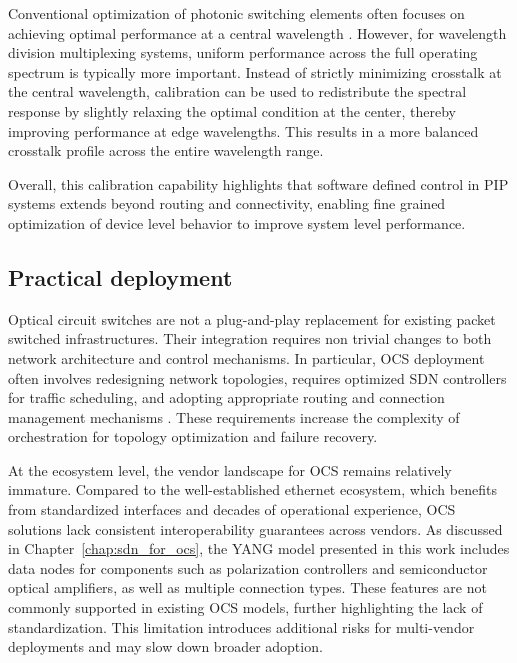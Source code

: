Conventional optimization of photonic switching elements often focuses on achieving optimal performance at a central wavelength \cite{10122910}.
However, for wavelength division multiplexing systems, uniform performance across the full operating spectrum is typically more important.
Instead of strictly minimizing crosstalk at the central wavelength, calibration can be used to redistribute the spectral response by slightly relaxing the optimal condition at the center,
thereby improving performance at edge wavelengths. This results in a more balanced crosstalk profile across the entire wavelength range.

Overall, this calibration capability highlights that software defined control in PIP systems extends beyond routing and connectivity, enabling fine grained optimization of device level behavior to improve system level performance.
\subsection{Practical deployment} \label{subsec:deployment}
Optical circuit switches are not a plug-and-play replacement for existing packet switched infrastructures.
Their integration requires non trivial changes to both network architecture and control mechanisms.
In particular, OCS deployment often involves redesigning network topologies, requires optimized SDN controllers for traffic scheduling, and adopting appropriate routing and connection management mechanisms \cite{shu2018programmable}.
These requirements increase the complexity of orchestration for topology optimization and failure recovery.

At the ecosystem level, the vendor landscape for OCS remains relatively immature.
Compared to the well-established ethernet ecosystem, which benefits from standardized interfaces and decades of operational experience, OCS solutions lack consistent interoperability guarantees across vendors.
As discussed in Chapter~\ref{chap:sdn_for_ocs}, the YANG model presented in this work includes data nodes for components such as polarization controllers and semiconductor optical amplifiers, as well as multiple connection types.
These features are not commonly supported in existing OCS models, further highlighting the lack of standardization.
This limitation introduces additional risks for multi-vendor deployments and may slow down broader adoption.

